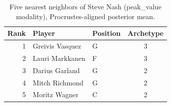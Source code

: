 \begin{table}[htbp]
  \centering\small
  \begin{tabular}{rllc}
    \toprule
    Rank & Player & Position & Archetype \\
    \midrule
    1 & Greivis Vasquez & G & 3 \\
    2 & Lauri Markkanen & F & 3 \\
    3 & Darius Garland & G & 2 \\
    4 & Mitch Richmond & G & 2 \\
    5 & Moritz Wagner & C & 2 \\
    \bottomrule
  \end{tabular}
  \caption{Five nearest neighbors of Steve Nash (peak_value modality), Procrustes-aligned posterior mean.}
  \label{tab:Steve_Nash_neighbors_peak_value}
\end{table}

